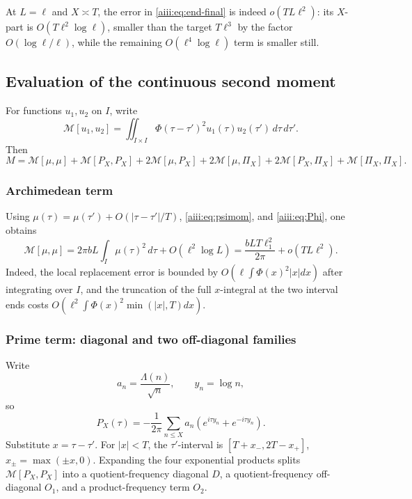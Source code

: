 \documentclass[11pt]{article}
\begin{document}
At $L=\ell$ and $X\asymp T$, the error in \eqref{aiii:eq:end-final} is
indeed $o(TL\ell^2)$: its $X$-part is
$O(T\ell^2\log\ell)$, smaller than the target $T\ell^3$ by the factor
$O(\log\ell/\ell)$, while the remaining
$O(\ell^4\log\ell)$ term is smaller still.


\subsection{Evaluation of the continuous second moment}

For functions $u_1,u_2$ on $I$, write
\[
 \mathcal M[u_1,u_2]=
 \iint_{I\times I}\Phi(\tau-\tau')^2
 u_1(\tau)u_2(\tau')\,d\tau\,d\tau'.
\]
Then
\[
 M=\mathcal M[\mu,\mu]+\mathcal M[P_X,P_X]
 +2\mathcal M[\mu,P_X]+2\mathcal M[\mu,\Pi_X]
 +2\mathcal M[P_X,\Pi_X]+\mathcal M[\Pi_X,\Pi_X].
\]

\subsubsection{Archimedean term}

Using $\mu(\tau)=\mu(\tau')+O(|\tau-\tau'|/T)$,
\eqref{aiii:eq:psimom}, and \eqref{aiii:eq:Phi}, one obtains
\begin{equation}\label{aiii:eq:arch}
 \mathcal M[\mu,\mu]
 =2\pi bL\int_I\mu(\tau)^2\,d\tau
 +O(\ell^2\log L)
 =\frac{bLT\ell_1^2}{2\pi}+o(TL\ell^2).
\end{equation}
Indeed, the local replacement error is bounded by
$O(\ell\int\Phi(x)^2|x|dx)$ after integrating over $I$, and the truncation
of the full $x$-integral at the two interval ends costs
$O(\ell^2\int\Phi(x)^2\min(|x|,T)dx)$.

\subsubsection{Prime term: diagonal and two off-diagonal families}

Write
\[
 a_n=\frac{\Lambda(n)}{\sqrt n},\qquad y_n=\log n,
\]
so
\[
 P_X(\tau)=-\frac1{2\pi}\sum_{n\le X}a_n
 (e^{i\tau y_n}+e^{-i\tau y_n}).
\]
Substitute $x=\tau-\tau'$.  For $|x|<T$, the $\tau'$-interval is
$[T+x_-,2T-x_+]$, $x_\pm=\max(\pm x,0)$.  Expanding the four exponential
products splits $\mathcal M[P_X,P_X]$ into a quotient-frequency diagonal
$D$, a quotient-frequency off-diagonal $O_1$, and a product-frequency term
$O_2$.
\end{document}
